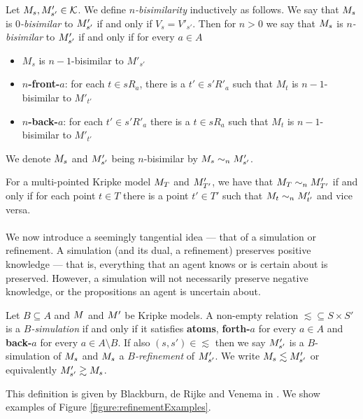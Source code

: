 \begin{defn} \label{nBisimKripke}
Let $M_s, M'_{s'} \in \mathcal{K}$.
We define {\em $n$-bisimilarity} inductively as follows.
We say that $M_s$ is {\em $0$-bisimilar} to $M'_{s'}$ if and only if $V_s = V'_{s'}$.
Then for $n > 0$ we say that $M_s$ is {\em $n$-bisimilar} to $M'_{s'}$ if and only if for every $a \in A$
\begin{itemize}
	\item $M_s$ is $n-1$-bisimilar to $M'_{s'}$
	\item {\bf $n$-front-$a$}: for each $t \in s R_a$, there is a $t' \in s' R'_a$ such that $M_t$ is
	$n-1$-bisimilar to $M'_{t'}$
	\item {\bf $n$-back-$a$}: for each $t' \in s' R'_a$ there is a $t \in s R_a$ such that $M_t$ is
	$n-1$-bisimilar to $M'_{t'}$
\end{itemize}
We denote $M_s$ and $M'_{s'}$ being $n$-bisimilar by $M_s \sim_n
M'_{s'}$.
\end{defn}

For a multi-pointed Kripke model $M_T$ and $M'_{T'}$, we have that
$M_T \sim_n
M'_{T'}$ if and only if for each point $t \in T$ there is a point $t' \in T'$
such that $M_t \sim_n M'_{t'}$ and vice versa.\\
\\
We now introduce a seemingly tangential idea --- that of a simulation or refinement.
A simulation (and its dual, a refinement) preserves positive knowledge --- that is, everything that an agent knows or is certain
about is preserved.
However, a simulation will not necessarily preserve negative knowledge, or the propositions an agent
is uncertain about.

\begin{defn} \label{refinement}
Let $B \subseteq A$ and $M$ and $M'$ be Kripke models. A non-empty relation $\lesssim \subseteq S
\times S'$ is a {\em $B$-simulation} if and only if it satisfies {\bf atoms}, {\bf forth-$a$} for
every $a \in A$ and {\bf back-$a$} for every $a \in A \setminus B$.
If also $(s, s') \in \lesssim$ then we say $M'_{s'}$ is a
$B$-simulation of $M_s$ and
$M_s$ a {\em $B$-refinement} of $M'_{s'}$.
We write $M_{s} \lesssim M'_{s'}$ or equivalently
$M'_{s'} \gtrsim M_{s}$.
\end{defn}

This definition is given by Blackburn, de Rijke and Venema in \cite{blackburn2002modal}.
We show examples of Figure \ref{figure:refinementExamples}.


